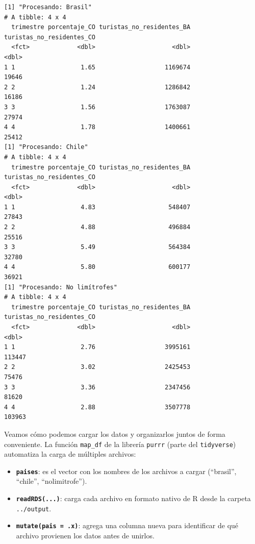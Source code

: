 \documentclass[
  spanish,
  letterpaper,
  DIV=11,
  numbers=noendperiod]{scrartcl}
\begin{document}
\begin{verbatim}
[1] "Procesando: Brasil"
# A tibble: 4 x 4
  trimestre porcentaje_CO turistas_no_residentes_BA turistas_no_residentes_CO
  <fct>             <dbl>                     <dbl>                     <dbl>
1 1                  1.65                   1169674                     19646
2 2                  1.24                   1286842                     16186
3 3                  1.56                   1763087                     27974
4 4                  1.78                   1400661                     25412
[1] "Procesando: Chile"
# A tibble: 4 x 4
  trimestre porcentaje_CO turistas_no_residentes_BA turistas_no_residentes_CO
  <fct>             <dbl>                     <dbl>                     <dbl>
1 1                  4.83                    548407                     27843
2 2                  4.88                    496884                     25516
3 3                  5.49                    564384                     32780
4 4                  5.80                    600177                     36921
[1] "Procesando: No limítrofes"
# A tibble: 4 x 4
  trimestre porcentaje_CO turistas_no_residentes_BA turistas_no_residentes_CO
  <fct>             <dbl>                     <dbl>                     <dbl>
1 1                  2.76                   3995161                    113447
2 2                  3.02                   2425453                     75476
3 3                  3.36                   2347456                     81620
4 4                  2.88                   3507778                    103963
\end{verbatim}

Veamos cómo podemos cargar los datos y organizarlos juntos de forma
conveniente. La función \texttt{map\_df} de la librería \texttt{purrr}
(parte del \texttt{tidyverse}) automatiza la carga de múltiples
archivos:

\begin{itemize}
\item
  \textbf{\texttt{paises}}: es el vector con los nombres de los archivos
  a cargar (``brasil'', ``chile'', ``nolimitrofe'').
\item
  \textbf{\texttt{readRDS(...)}}: carga cada archivo en formato nativo
  de R desde la carpeta \texttt{../output}.
\item
  \textbf{\texttt{mutate(pais\ =\ .x)}}: agrega una columna nueva para
  identificar de qué archivo provienen los datos antes de unirlos.
\end{itemize}
\end{document}
